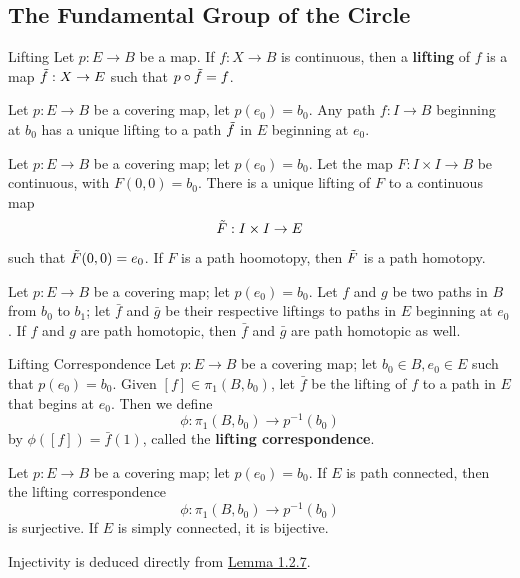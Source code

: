 \documentclass[12pt,a4paper]{article}
\begin{document}
    \subsection{The Fundamental Group of the Circle}
    \begin{defi}{Lifting}
        Let $p:E\to B$ be a map. If $f:X\to B$ is continuous, then a \textbf{lifting} of $f$ is a map $\Tilde{f}:X\to E$ such that $p\circ \Tilde{f}=f$.
    \end{defi}
    \begin{lemma}
        Let $p:E\to B$ be a covering map, let $p(e_0)=b_0$. Any path $f:I\to B$ beginning at $b_0$ has a unique lifting to a path $\Tilde{f}$ in $E$ beginning at $e_0$.
    \end{lemma}
    \bigskip

    \begin{lemma}
        Let $p:E\to B$ be a covering map; let $p(e_0)=b_0$. Let the map $F:I\times I\to B$ be continuous, with $F(0,0)=b_0$. There is a unique lifting of $F$ to a continuous map
        \[
            \Tilde{F}:I\times I\to E
        \]
        such that $\Tilde{F}(0,0)=e_0$. If $F$ is a path hoomotopy, then $\Tilde{F}$ is a path homotopy.
    \end{lemma}
    \bigskip

    \begin{thm}
        Let $p:E\to B$ be a covering map; let $p(e_0)=b_0$. Let $f$ and $g$ be two paths in $B$ from $b_0$ to $b_1$; let $\bar{f}$ and $\bar{g}$ be their respective liftings to paths in $E$ beginning at $e_0$. If $f$ and $g$ are path homotopic, then $\bar{f}$ and $\bar{g}$ are path homotopic as well.
    \end{thm}
    \bigskip

    \begin{defi}{Lifting Correspondence}
        Let $p:E\to B$ be a covering map; let $b_0\in B,e_0\in E$ such that $p(e_0)=b_0$. Given $[f]\in\pi_1(B,b_0)$, let $\bar{f}$ be the lifting of $f$ to a path in $E$ that begins at $e_0$. Then we define
        \[
            \phi:\pi_1(B,b_0)\to p^{-1}(b_0)
        \]
        by $\phi([f])=\bar{f}(1)$, called the \textbf{lifting correspondence}. 
    \end{defi}
    \bigskip

    \begin{thm}\label{1.4.6}
        Let $p:E\to B$ be a covering map; let $p(e_0)=b_0$. If $E$ is path connected, then the lifting correspondence
        \[
            \phi:\pi_1(B,b_0)\to p^{-1}(b_0)
        \]
        is surjective. If $E$ is simply connected, it is bijective.
    \end{thm}
    \begin{remark}
        Injectivity is deduced directly from \hyperref[1.2.7]{Lemma 1.2.7}.
    \end{remark}
    \bigskip
\end{document}
